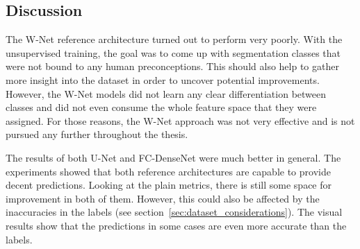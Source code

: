 \subsection{Discussion}
\label{sec:segmentation_discussion}
The W-Net reference architecture turned out to perform very poorly. With the unsupervised training, the goal was to come up with segmentation classes that were not bound to any human preconceptions. This should also help to gather more insight into the dataset in order to uncover potential improvements. However, the W-Net models did not learn any clear differentiation between classes and did not even consume the whole feature space that they were assigned. For those reasons, the W-Net approach was not very effective and is not pursued any further throughout the thesis.

The results of both U-Net and FC-DenseNet were much better in general. The experiments showed that both reference architectures are capable to provide decent predictions. Looking at the plain metrics, there is still some space for improvement in both of them. However, this could also be affected by the inaccuracies in the labels (see section~\ref{sec:dataset_considerations}). The visual results show that the predictions in some cases are even more accurate than the labels.


